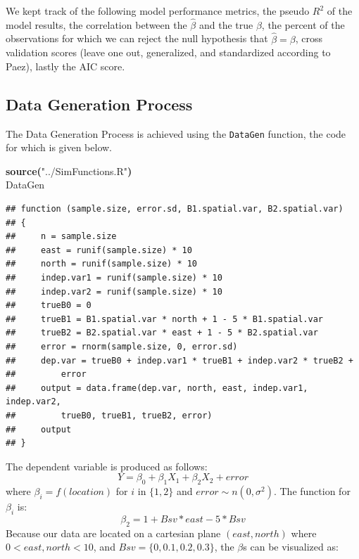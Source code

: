 \documentclass{article}
\makeatletter
\newcommand{\hlfunctioncall}[1]{\textcolor[rgb]{0.501960784313725,0,0.329411764705882}{\textbf{#1}}}%
\newcommand{\hlstring}[1]{\textcolor[rgb]{0.6,0.6,1}{#1}}%
\newcommand{\hlkeyword}[1]{\textcolor[rgb]{0,0,0}{\textbf{#1}}}%
\newcommand{\hlsymbol}[1]{\textcolor[rgb]{0,0,0}{#1}}%
\newcommand{\hlstd}[1]{\textcolor[rgb]{0,0,0}{#1}}%
\newenvironment{kframe}{%
 \def\FrameCommand##1{\hskip\@totalleftmargin \hskip-\fboxsep
 \colorbox{shadecolor}{##1}\hskip-\fboxsep
     \hskip-\linewidth \hskip-\@totalleftmargin \hskip\columnwidth}%
 \MakeFramed {\advance\hsize-\width
   \@totalleftmargin\z@ \linewidth\hsize
   \@setminipage}}%
 {\par\unskip\endMakeFramed}
\newenvironment{knitrout}{}{} %
\makeatother
\begin{document}
We kept track of the following model performance metrics, the pseudo $R^2$ of the model results, the correlation between the $\hat{\beta}$ and the true $\beta$, the percent of the observations for which we can reject the null hypothesis that $\hat{\beta}=\beta$, cross validation scores (leave one out, generalized, and standardized according to Paez), lastly the AIC score.

\subsection{Data Generation Process}

The Data Generation Process is achieved using the \texttt{DataGen} function, the code for which is given below. 
\begin{knitrout}
\color{fgcolor}\begin{kframe}
\begin{flushleft}
\ttfamily\noindent
\hlfunctioncall{source}\hlkeyword{(}\hlstring{"{}../SimFunctions.R"{}}\hlkeyword{)}\hspace*{\fill}\\
\hlstd{}\hlsymbol{DataGen}\mbox{}
\normalfont
\end{flushleft}
\begin{verbatim}
## function (sample.size, error.sd, B1.spatial.var, B2.spatial.var) 
## {
##     n = sample.size
##     east = runif(sample.size) * 10
##     north = runif(sample.size) * 10
##     indep.var1 = runif(sample.size) * 10
##     indep.var2 = runif(sample.size) * 10
##     trueB0 = 0
##     trueB1 = B1.spatial.var * north + 1 - 5 * B1.spatial.var
##     trueB2 = B2.spatial.var * east + 1 - 5 * B2.spatial.var
##     error = rnorm(sample.size, 0, error.sd)
##     dep.var = trueB0 + indep.var1 * trueB1 + indep.var2 * trueB2 + 
##         error
##     output = data.frame(dep.var, north, east, indep.var1, indep.var2, 
##         trueB0, trueB1, trueB2, error)
##     output
## }
\end{verbatim}
\end{kframe}
\end{knitrout}


The dependent variable is produced as follows:
\begin{equation}
Y = \beta _0 + \beta _1 X_1 + \beta _2 X_2 + error
\end{equation}
where $\beta _i = f(location)$ for $i$ in $\{1, 2\}$ and $error \sim n(0, \sigma ^2)$. The function for $\beta _i$ is:
\begin{equation}
\beta _2 = 1 + Bsv * east - 5*Bsv
\end{equation}
Because our data are located on a cartesian plane $(east, north)$ where $0 < east, north < 10$, and $Bsv = \{0, 0.1, 0.2, 0.3\}$, the $\beta$s can be visualized as:
\end{document}
